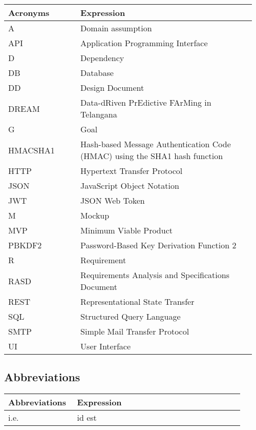 \begin{center}
	\begin{longtable}{@{}p{0.28\linewidth} p{0.68\linewidth}@{}}
		\toprule
		\textbf{Acronyms}   & \textbf{Expression}\\
		\endfirsthead
		\midrule
		A                   & Domain assumption\\
		API                 & Application Programming Interface\\
		D                   & Dependency \\
		DB                  & Database\\
		DD                  & Design Document\\
		DREAM               & Data-dRiven PrEdictive FArMing in Telangana\\
		G					& Goal\\
		HMACSHA1            & Hash-based Message Authentication Code (HMAC) using the SHA1 hash function \\
		HTTP                & Hypertext Transfer Protocol\\
		JSON                & JavaScript Object Notation\\
		JWT                 & JSON Web Token\\
		M					& Mockup\\
		MVP                 & Minimum Viable Product\\
		PBKDF2              & Password-Based Key Derivation Function 2 \\ 
		R                   & Requirement\\
		RASD                & Requirements Analysis and Specifications Document\\
		REST				& Representational State Transfer\\
		SQL                 & Structured Query Language\\
		SMTP                & Simple Mail Transfer Protocol\\
		UI				  	& User Interface\\
		\bottomrule
	\end{longtable}
\end{center}

\subsection{Abbreviations}

\begin{center}
	\begin{longtable}{@{}p{0.28\linewidth} p{0.68\linewidth}@{}}
		\toprule
		\textbf{Abbreviations}  & \textbf{Expression}\\
		\midrule
	    i.e. & id est\\
		\bottomrule
	\end{longtable}
\end{center}


